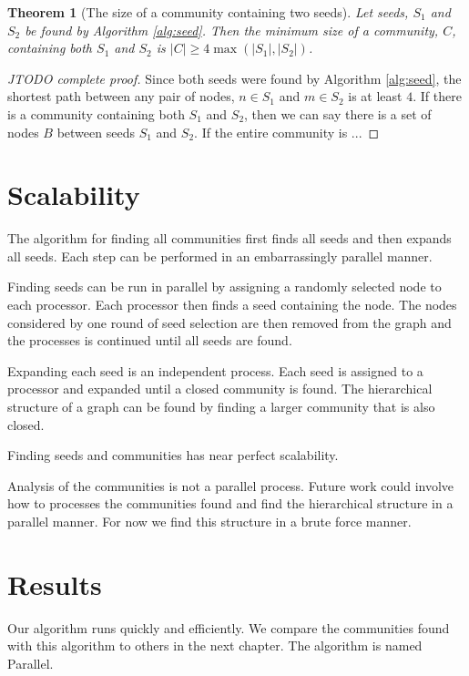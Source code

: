 \documentclass[phd,tocprelim]{cornell}
\newtheorem{theorem}{Theorem}[section]
\newtheorem{proof}[definition]{Proof}
\begin{document}
\begin{theorem}[The size of a community containing two seeds]
Let seeds, $S_1$ and $S_2$ be found by Algorithm \ref{alg:seed}.  Then the minimum size of a community, $C$, containing both $S_1$ and $S_2$ is $|C| \geq4 \max(|S_1|, |S_2|)$.
\end{theorem}
\begin{proof}
[JTODO complete proof]
Since both seeds were found by Algorithm \ref{alg:seed}, the shortest path between any pair of nodes, $n \in S_1$ and $m \in S_2$ is at least $4$. If there is a community containing both $S_1$ and $S_2$, then we can say there is a set of nodes $B$ between seeds $S_1$ and $S_2$.  If the entire community is ...
\end{proof}


\section {Scalability}

The algorithm for finding all communities first finds all seeds and then expands all seeds.  Each step can be performed in an embarrassingly parallel manner.

Finding seeds can be run in parallel by assigning a randomly selected node to each processor.  Each processor then finds a seed containing the node.  The nodes considered by one round of seed selection are then removed from the graph and the processes is continued until all seeds are found.

Expanding each seed is an independent process.  Each seed is assigned to a processor and expanded until a closed community is found.  The hierarchical structure of a graph can be found by finding a larger community that is also closed.

Finding seeds and communities has near perfect scalability.

Analysis of the communities is not a parallel process.  Future work could involve how to processes the communities found and find the hierarchical structure in a parallel manner.  For now we find this structure in a brute force manner.

\section{Results}

Our algorithm runs quickly and efficiently.  We compare the communities found with this algorithm to others in the next chapter.  The algorithm is named {\sc Parallel}.
\end{document}
